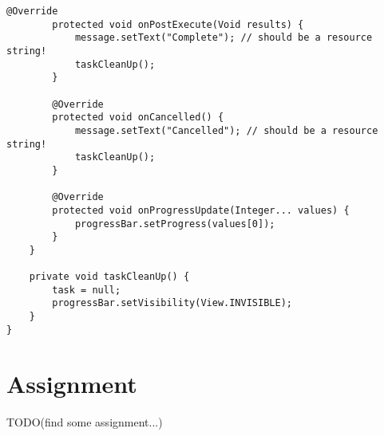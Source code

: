 \begin{lstlisting}[style=A_Java, caption={Background task done with asynchronous task}, label={listing:asyncprog}]
        @Override
        protected void onPostExecute(Void results) {
            message.setText("Complete"); // should be a resource string!
            taskCleanUp();
        }

        @Override
        protected void onCancelled() {
            message.setText("Cancelled"); // should be a resource string!
            taskCleanUp();
        }

        @Override
        protected void onProgressUpdate(Integer... values) {
            progressBar.setProgress(values[0]);
        }
    }

    private void taskCleanUp() {
        task = null;
        progressBar.setVisibility(View.INVISIBLE);
    }
}
\end{lstlisting}

\section{Assignment}
{\Huge TODO(find some assignment...)}






